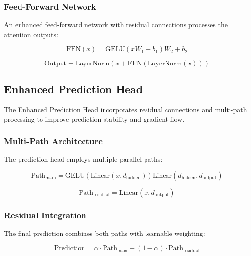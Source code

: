\documentclass[12pt]{uomthesis}
\begin{document}
\subsubsection{Feed-Forward Network}

An enhanced feed-forward network with residual connections processes the attention outputs:

\begin{equation}
\text{FFN}(x) = \text{GELU}(xW_1 + b_1)W_2 + b_2
\end{equation}

\begin{equation}
\text{Output} = \text{LayerNorm}(x + \text{FFN}(\text{LayerNorm}(x)))
\end{equation}

\subsection{Enhanced Prediction Head}

The Enhanced Prediction Head incorporates residual connections and multi-path processing to improve prediction stability and gradient flow.

\subsubsection{Multi-Path Architecture}

The prediction head employs multiple parallel paths:

\begin{equation}
\text{Path}_{\text{main}} = \text{GELU}(\text{Linear}(x, d_{\text{hidden}}))\text{Linear}(d_{\text{hidden}}, d_{\text{output}})
\end{equation}

\begin{equation}
\text{Path}_{\text{residual}} = \text{Linear}(x, d_{\text{output}})
\end{equation}

\subsubsection{Residual Integration}

The final prediction combines both paths with learnable weighting:

\begin{equation}
\text{Prediction} = \alpha \cdot \text{Path}_{\text{main}} + (1-\alpha) \cdot \text{Path}_{\text{residual}}
\end{equation}
\end{document}
